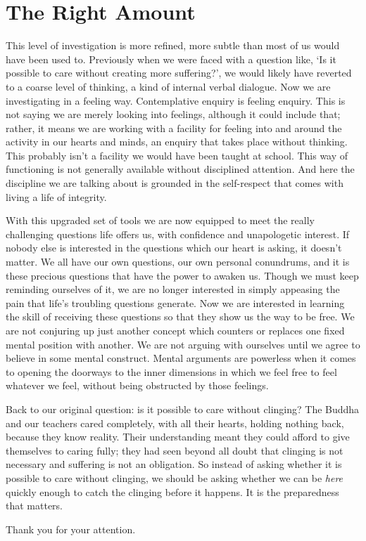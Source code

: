 \section{The Right Amount}

This level of investigation is more refined, more subtle than most of us would
have been used to. Previously when we were faced with a
question like, ‘Is it possible to care without creating more
suffering?’, we would likely have reverted to a coarse level of
thinking, a kind of internal verbal dialogue. Now we are investigating
in a feeling way. Contemplative enquiry is feeling enquiry. This is not
saying we are merely looking into feelings, although it could include
that; rather, it means we are working with a facility for feeling into
and around the activity in our hearts and minds, an enquiry that takes
place without thinking. This probably isn’t a facility we would have
been taught at school. This way of functioning is not generally
available without disciplined attention. And here the discipline we are
talking about is grounded in the self-respect that comes with living a
life of integrity.

With this upgraded set of tools we are now equipped to meet the really
challenging questions life offers us, with confidence and unapologetic
interest. If nobody else is interested in the questions which our heart
is asking, it doesn’t matter. We all have our own questions, our own
personal conundrums, and it is these precious questions that have the
power to awaken us. Though we must keep reminding ourselves of it, we
are no longer interested in simply appeasing the pain that life’s
troubling questions generate. Now we are interested in learning the
skill of receiving these questions so that they show us the way to be
free. We are not conjuring up just another concept which counters or
replaces one fixed mental position with another. We are not arguing with
ourselves until we agree to believe in some mental construct. Mental
arguments are powerless when it comes to opening the doorways to the
inner dimensions in which we feel free to feel whatever we feel, without
being obstructed by those feelings.

Back to our original question: is it possible to care without clinging?
The Buddha and our teachers cared completely, with all their hearts,
holding nothing back, because they know reality. Their understanding
meant they could afford to give themselves to caring fully; they had
seen beyond all doubt that clinging is not necessary and suffering is
not an obligation. So instead of asking whether it is possible to care
without clinging, we should be asking whether we can be \emph{here} quickly
enough to catch the clinging before it happens. It is the preparedness
that matters.

Thank you for your attention.
